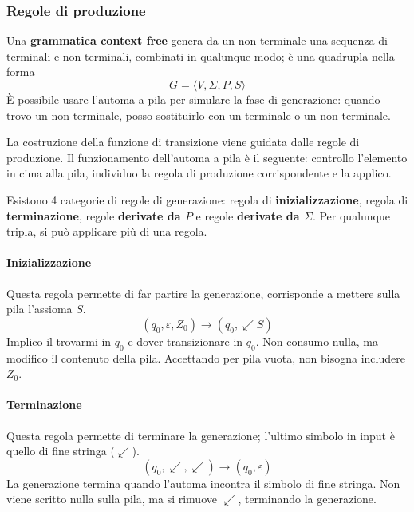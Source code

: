 \documentclass[11pt]{article}
\begin{document}
\subsubsection{Regole di produzione}
Una \textbf{grammatica context free} genera da un non terminale una sequenza di terminali e non terminali, combinati in qualunque 
modo; è una quadrupla nella forma 
\begin{equation*}
    G=\langle V,\Sigma,P,S\rangle
\end{equation*}
È possibile usare l'automa a pila per simulare la fase di generazione: quando trovo un non terminale, posso sostituirlo 
con un terminale o un non terminale.

La costruzione della funzione di transizione viene guidata dalle regole di produzione.
Il funzionamento dell'automa a pila è il seguente: controllo l'elemento in cima alla pila, individuo la regola di produzione 
corrispondente e la applico. 

Esistono 4 categorie di regole di generazione: regola di \textbf{inizializzazione}, regola di \textbf{terminazione}, 
regole \textbf{derivate da $P$} e regole \textbf{derivate da $\Sigma$}.
Per qualunque tripla, si può applicare più di una regola.
\paragraph*{Inizializzazione}
Questa regola permette di far partire la generazione, corrisponde a mettere sulla pila l'assioma $S$.
\begin{equation*}
    (q_0,\varepsilon,Z_0)\rightarrow(q_0,\swarrow S)
\end{equation*}
Implico il trovarmi in $q_0$ e dover transizionare in $q_0$. Non consumo nulla, ma modifico il contenuto della pila. 
Accettando per pila vuota, non bisogna includere $Z_0$.
\paragraph*{Terminazione}
Questa regola permette di terminare la generazione; l'ultimo simbolo in input è quello di fine stringa ($\swarrow$).
\begin{equation*}
    (q_0,\swarrow,\swarrow)\rightarrow(q_0,\varepsilon)
\end{equation*}
La generazione termina quando l'automa incontra il simbolo di fine stringa. Non viene scritto nulla sulla pila, ma si rimuove 
$\swarrow$, terminando la generazione.
\end{document}
